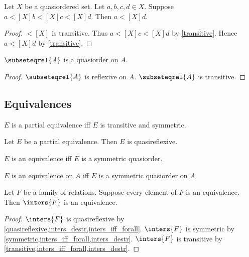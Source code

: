 \begin{lemma}\label{quasiorder_transitive_double}
    Let $X$ be a quasiordered set.
    Let $a, b, c, d \in X$.
    Suppose $a\mathrel{\lt[X]} b\mathrel{\lt[X]} c\mathrel{\lt[X]} d$.
    Then $a\mathrel{\lt[X]} d$.
\end{lemma}
\begin{proof}
    $\lt[X]$ is transitive.
    Thus $a\mathrel{\lt[X]} c\mathrel{\lt[X]} d$ by \cref{transitive}.
    Hence $a\mathrel{\lt[X]} d$ by \cref{transitive}.
\end{proof}

\begin{proposition}\label{subseteqrel_is_quasiorder}
    $\subseteqrel{A}$ is a quasiorder on $A$.
\end{proposition}
\begin{proof}
    $\subseteqrel{A}$ is reflexive on $A$.
    $\subseteqrel{A}$ is transitive.
\end{proof}

\subsection{Equivalences}

\begin{abbreviation}\label{partialequivalence}
    $E$ is a partial equivalence iff
    $E$ is transitive and symmetric.
\end{abbreviation}

\begin{proposition}\label{partialequivalence_is_quasireflexive}
    Let $E$ be a partial equivalence.
    Then $E$ is quasireflexive.
\end{proposition}

\begin{abbreviation}\label{equivalence}
    $E$ is an equivalence iff
    $E$ is a symmetric quasiorder.
\end{abbreviation}

\begin{abbreviation}\label{equivalence_on}
    $E$ is an equivalence on $A$ iff
    $E$ is a symmetric quasiorder on $A$.
\end{abbreviation}

\begin{proposition}\label{inters_of_family_of_equivalences_is_equivalence}
    Let $F$ be a family of relations.
    Suppose every element of $F$ is an equivalence.
    Then $\inters{F}$ is an equivalence.
\end{proposition}
\begin{proof}
    $\inters{F}$ is quasireflexive by \cref{quasireflexive,inters_destr,inters_iff_forall}.
    $\inters{F}$ is symmetric by \cref{symmetric,inters_iff_forall,inters_destr}.
    $\inters{F}$ is transitive by \cref{transitive,inters_iff_forall,inters_destr}.
\end{proof}

